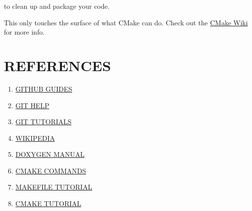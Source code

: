 \documentclass[11pt,utf8]{article}
\begin{document}
to clean up and package your code.

This only touches the surface of what CMake can do. Check out the \href{http://www.cmake.org/Wiki/CMake}{CMake Wiki} for more info.

\section{REFERENCES}
\begin{enumerate}[1]

 \item \href{https://guides.github.com/}{GITHUB GUIDES}
\item \href{https://help.github.com/articles/creating-an-issue/}{GIT HELP}
\item \href{https://www.atlassian.com/git/tutorials}{GIT TUTORIALS}
\item \href{https://en.wikipedia.org/wiki/Linus_Torvalds}{WIKIPEDIA}
\item \href{http://www.stack.nl/~dimitri/doxygen/manual/docblocks.html.}{DOXYGEN MANUAL}   
\item \href{http://www.cmake.org/cmake/help/v3.0/command/option.html}{CMAKE COMMANDS}
\item \href{http://gl.developpez.com/tutoriel/outil/makefile/}{MAKEFILE TUTORIAL}
 \item \href{http://www.cmake.org/cmake-tutorial/}{CMAKE TUTORIAL}
\end{enumerate}
\end{document}
